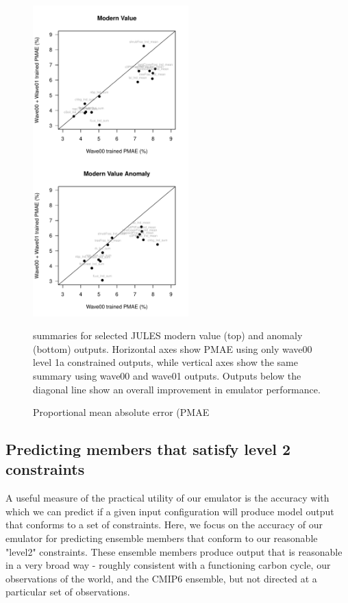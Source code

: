 \documentclass[gmd, manuscript]{copernicus}
\begin{document}
%
\begin{figure}[t]
\includegraphics[width=6cm]{./figs/figA03.pdf}
\caption{Proportional mean absolute error (PMAE} summaries for selected JULES modern value (top) and anomaly (bottom) outputs. Horizontal axes show PMAE using only wave00 level 1a constrained outputs, while vertical axes show the same summary using wave00 and wave01 outputs. Outputs below the diagonal line show an overall improvement in emulator performance. 
\label{fig:PMAE_comparison}
\end{figure}

\subsection{Predicting members that satisfy level 2 constraints}\label{app:level_2_pred} 

A useful measure of the practical utility of our emulator is the accuracy with which we can predict if a given input configuration will produce model output that conforms to a set of constraints. Here, we focus on the accuracy of our emulator for predicting ensemble members that conform to our reasonable "level2" constraints. These ensemble members produce output that is reasonable in a very broad way - roughly consistent with a functioning carbon cycle, our observations of the world, and the CMIP6 ensemble, but not directed at a particular set of observations.
\end{document}
